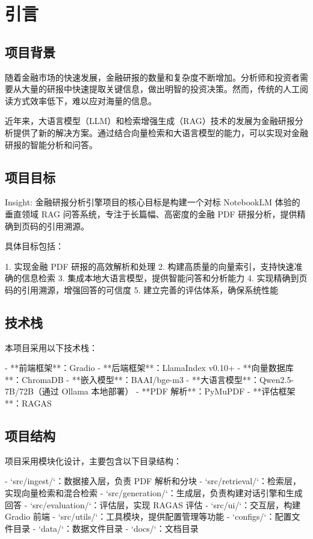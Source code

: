 \section{引言}

\subsection{项目背景}

随着金融市场的快速发展，金融研报的数量和复杂度不断增加。分析师和投资者需要从大量的研报中快速提取关键信息，做出明智的投资决策。然而，传统的人工阅读方式效率低下，难以应对海量的信息。

近年来，大语言模型（LLM）和检索增强生成（RAG）技术的发展为金融研报分析提供了新的解决方案。通过结合向量检索和大语言模型的能力，可以实现对金融研报的智能分析和问答。

\subsection{项目目标}

Insight: 金融研报分析引擎项目的核心目标是构建一个对标 NotebookLM 体验的垂直领域 RAG 问答系统，专注于长篇幅、高密度的金融 PDF 研报分析，提供精确到页码的引用溯源。

具体目标包括：

1. 实现金融 PDF 研报的高效解析和处理
2. 构建高质量的向量索引，支持快速准确的信息检索
3. 集成本地大语言模型，提供智能问答和分析能力
4. 实现精确到页码的引用溯源，增强回答的可信度
5. 建立完善的评估体系，确保系统性能

\subsection{技术栈}

本项目采用以下技术栈：

- **前端框架**：Gradio
- **后端框架**：LlamaIndex v0.10+
- **向量数据库**：ChromaDB
- **嵌入模型**：BAAI/bge-m3
- **大语言模型**：Qwen2.5-7B/72B（通过 Ollama 本地部署）
- **PDF 解析**：PyMuPDF
- **评估框架**：RAGAS

\subsection{项目结构}

项目采用模块化设计，主要包含以下目录结构：

- `src/ingest/`：数据接入层，负责 PDF 解析和分块
- `src/retrieval/`：检索层，实现向量检索和混合检索
- `src/generation/`：生成层，负责构建对话引擎和生成回答
- `src/evaluation/`：评估层，实现 RAGAS 评估
- `src/ui/`：交互层，构建 Gradio 前端
- `src/utils/`：工具模块，提供配置管理等功能
- `configs/`：配置文件目录
- `data/`：数据文件目录
- `docs/`：文档目录
